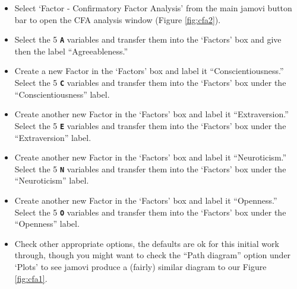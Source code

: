 \documentclass[
]{book}
\providecommand{\tightlist}{%
  \setlength{\itemsep}{0pt}\setlength{\parskip}{0pt}}
\begin{document}
\begin{itemize}
\tightlist
\item
  Select `Factor - Confirmatory Factor Analysis' from the main jamovi button bar to open the CFA analysis window (Figure \ref{fig:cfa2}).
\item
  Select the 5 \textbf{\texttt{A}} variables and transfer them into the `Factors' box and give then the label ``Agreeableness.''
\item
  Create a new Factor in the `Factors' box and label it ``Conscientiousness.'' Select the 5 \textbf{\texttt{C}} variables and transfer them into the `Factors' box under the ``Conscientiousness'' label.
\item
  Create another new Factor in the `Factors' box and label it ``Extraversion.'' Select the 5 \textbf{\texttt{E}} variables and transfer them into the `Factors' box under the ``Extraversion'' label.
\item
  Create another new Factor in the `Factors' box and label it ``Neuroticism.'' Select the 5 \textbf{\texttt{N}} variables and transfer them into the `Factors' box under the ``Neuroticism'' label.
\item
  Create another new Factor in the `Factors' box and label it ``Openness.'' Select the 5 \textbf{\texttt{O}} variables and transfer them into the `Factors' box under the ``Openness'' label.
\item
  Check other appropriate options, the defaults are ok for this initial work through, though you might want to check the ``Path diagram'' option under `Plots' to see jamovi produce a (fairly) similar diagram to our Figure \ref{fig:cfa1}.
\end{itemize}
\end{document}
